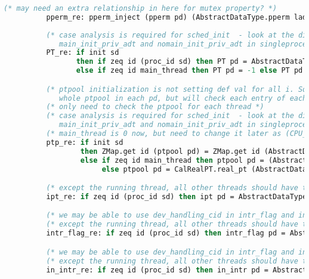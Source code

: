 \begin{lstlisting}[language=Caml]
          (* may need an extra relationship in here for mutex property? *)
          pperm_re: pperm_inject (pperm pd) (AbstractDataType.pperm ladt);
          
          (* case analysis is required for sched_init  - look at the difference between 
             main_init_priv_adt and nomain_init_priv_adt in singleprocessor/AuxSingleAbstractData.v file *)
          PT_re: if init sd 
                 then if zeq id (proc_id sd) then PT pd = AbstractDataType.PT ladt else PT pd = 0
                 else if zeq id main_thread then PT pd = -1 else PT pd = 0;

          (* ptpool initialization is not setting def val for all i. So I will keep the 
             whole ptpool in each pd, but will check each entry of each thread's ptpool for simulation *)
          (* only need to check the ptpool for each thread *)
          (* case analysis is required for sched_init  - look at the difference between 
             main_init_priv_adt and nomain_init_priv_adt in singleprocessor/AuxSingleAbstractData.v file *)
          (* main_thread is 0 now, but need to change it later as (CPU_ID adt) + 1 *)
          ptp_re: if init sd 
                  then ZMap.get id (ptpool pd) = ZMap.get id (AbstractDataType.ptpool ladt)
                  else if zeq id main_thread then ptpool pd = (AbstractDataType.ptpool ladt) 
                       else ptpool pd = CalRealPT.real_pt (AbstractDataType.ptpool ladt);

          (* except the running thread, all other threads should have the default value  - necessary for yield and sleep case *)
          ipt_re: if zeq id (proc_id sd) then ipt pd = AbstractDataType.ipt ladt else ipt pd = true;

          (* we may be able to use dev_handling_cid in intr_flag and in_intr too. But, the current version may be fine now *)
          (* except the running thread, all other threads should have the default value - necessary for yield and sleep case *)
          intr_flag_re: if zeq id (proc_id sd) then intr_flag pd = AbstractDataType.intr_flag ladt else intr_flag pd = true;

          (* we may be able to use dev_handling_cid in intr_flag and in_intr too. But, the current version may be fine now *)
          (* except the running thread, all other threads should have the default value - necessary for yield and sleep case *)          
          in_intr_re: if zeq id (proc_id sd) then in_intr pd = AbstractDataType.in_intr ladt else in_intr pd = false;


\end{lstlisting}

